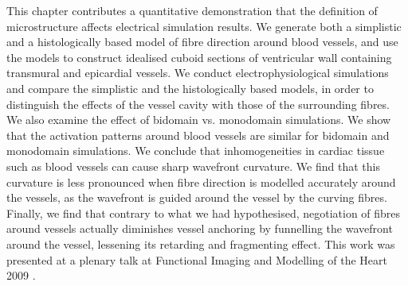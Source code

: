
This chapter contributes a quantitative demonstration that the definition of microstructure affects electrical simulation results. We generate both a simplistic and a histologically based model of fibre direction around blood vessels, and use the models to construct idealised cuboid sections of ventricular wall containing transmural and epicardial vessels. We conduct electrophysiological simulations and compare the simplistic and the histologically based models, in order to distinguish the effects of the vessel cavity with those of the surrounding fibres. We also examine the effect of bidomain vs. monodomain simulations. We show that the activation patterns around blood vessels are similar for bidomain and monodomain simulations. We conclude that inhomogeneities in cardiac tissue such as blood vessels can cause sharp wavefront curvature. We find that this curvature is less pronounced when fibre direction is modelled accurately around the vessels, as the wavefront is guided around the vessel by the curving fibres. Finally, we find that contrary to what we had hypothesised, negotiation of fibres around vessels actually diminishes vessel anchoring by funnelling the wavefront around the vessel, lessening its retarding and fragmenting effect. This work was presented at a plenary talk at Functional Imaging and Modelling of the Heart 2009 \cite{Gibb2009}.
